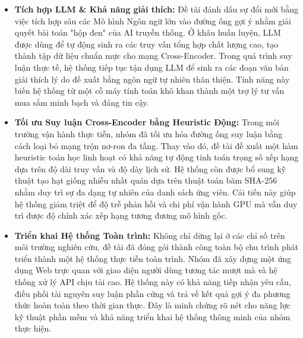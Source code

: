 \begin{itemize}
    \item \textbf{Tích hợp LLM \& Khả năng giải thích:} Đề tài đánh dấu sự đổi mới bằng việc tích hợp sâu các Mô hình Ngôn ngữ lớn vào đường ống gợi ý nhằm giải quyết bài toán "hộp đen" của AI truyền thống. Ở khâu huấn luyện, LLM được dùng để tự động sinh ra các truy vấn tổng hợp chất lượng cao, tạo thành tập dữ liệu chuẩn mực cho mạng Cross-Encoder. Trong quá trình suy luận thực tế, hệ thống tiếp tục tận dụng LLM để sinh ra các đoạn văn bản giải thích lý do đề xuất bằng ngôn ngữ tự nhiên thân thiện. Tính năng này biến hệ thống từ một cỗ máy tính toán khô khan thành một trợ lý tư vấn mua sắm minh bạch và đáng tin cậy.
    
    \item \textbf{Tối ưu Suy luận Cross-Encoder bằng Heuristic Động:} Trong môi trường vận hành thực tiễn, nhóm đã tối ưu hóa đường ống suy luận bằng cách loại bỏ mạng trộn nơ-ron đa tầng. Thay vào đó, đề tài đề xuất một hàm heuristic toán học linh hoạt có khả năng tự động tính toán trọng số xếp hạng dựa trên độ dài truy vấn và độ dày lịch sử. Hệ thống còn được bổ sung kỹ thuật tạo hạt giống nhiễu nhất quán dựa trên thuật toán băm SHA-256 nhằm duy trì sự đa dạng tự nhiên của danh sách ứng viên. Cải tiến này giúp hệ thống giảm triệt để độ trễ phản hồi và chi phí vận hành GPU mà vẫn duy trì được độ chính xác xếp hạng tương đương mô hình gốc.
    
    \item \textbf{Triển khai Hệ thống Toàn trình:} Không chỉ dừng lại ở các chỉ số trên môi trường nghiên cứu, đề tài đã đóng gói thành công toàn bộ chu trình phát triển thành một hệ thống thực tiễn toàn trình. Nhóm đã xây dựng một ứng dụng Web trực quan với giao diện người dùng tương tác mượt mà và hệ thống xử lý API chịu tải cao. Hệ thống này có khả năng tiếp nhận yêu cầu, điều phối tài nguyên suy luận phần cứng và trả về kết quả gợi ý đa phương thức hoàn toàn theo thời gian thực. Đây là minh chứng rõ nét cho năng lực kỹ thuật phần mềm và khả năng triển khai hệ thống thông minh của nhóm thực hiện.
\end{itemize}